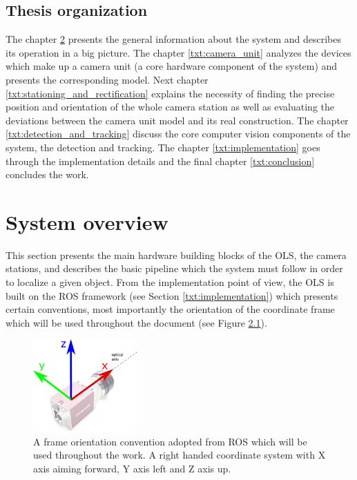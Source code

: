 \section{Thesis organization}

The chapter \ref{txt:system_overview} presents the general information about the system and describes its operation in a big picture. The chapter \ref{txt:camera_unit} analyzes the devices which make up a camera unit (a core hardware component of the system) and presents the corresponding model. Next chapter \ref{txt:stationing_and_rectification} explains the necessity of finding the precise position and orientation of the whole camera station as well as evaluating the deviations between the camera unit model and its real construction. The chapter \ref{txt:detection_and_tracking} discuss the core computer vision components of the system, the detection and tracking. The chapter \ref{txt:implementation} goes through the implementation details and the final chapter \ref{txt:conclusion} concludes the work.


\chapter{System overview} \label{txt:system_overview}

This section presents the main hardware building blocks of the OLS, the camera stations, and describes the basic pipeline which the system must follow in order to localize a given object. From the implementation point of view, the OLS is built on the ROS framework (see Section \ref{txt:implementation}) which presents certain conventions, most importantly the orientation of the coordinate frame which will be used throughout the document (see Figure \ref{fig:frame_convention}).

\begin{figure}[htb]
	\centering
	\includegraphics[width=4cm]{fig/frame_convention.pdf}
	\caption{A frame orientation convention adopted from ROS which will be used throughout the work. A right handed coordinate system with X axis aiming forward, Y axis left and Z axis up.}
	\label{fig:frame_convention}
\end{figure}

